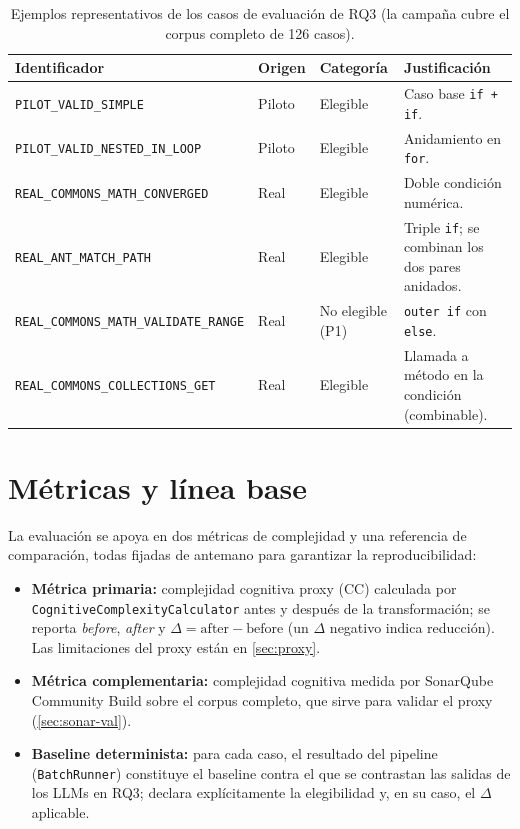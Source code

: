 \begin{table}[ht]
\centering
\footnotesize
\caption{Ejemplos representativos de los casos de evaluación de RQ3
(la campaña cubre el corpus completo de 126 casos).}
\label{tab:subset-rq3}
\begin{tabularx}{\linewidth}{@{}lll>{\raggedright\arraybackslash}X@{}}
\toprule
\textbf{Identificador} & \textbf{Origen} & \textbf{Categoría} & \textbf{Justificación} \\
\midrule
\texttt{PILOT\_VALID\_SIMPLE} & Piloto & Elegible & Caso base \lstinline|if + if|. \\
\texttt{PILOT\_VALID\_NESTED\_IN\_LOOP} & Piloto & Elegible & Anidamiento en \lstinline|for|. \\
\texttt{REAL\_COMMONS\_MATH\_CONVERGED} & Real & Elegible & Doble condición numérica. \\
\texttt{REAL\_ANT\_MATCH\_PATH} & Real & Elegible & Triple \lstinline|if|; se combinan los dos pares anidados. \\
\texttt{REAL\_COMMONS\_MATH\_VALIDATE\_RANGE} & Real & No elegible (P1) & \lstinline|outer if| con \lstinline|else|. \\
\texttt{REAL\_COMMONS\_COLLECTIONS\_GET} & Real & Elegible & Llamada a método en la condición (combinable). \\
\bottomrule
\end{tabularx}
\end{table}

\section{Métricas y línea base}
La evaluación se apoya en dos métricas de complejidad y una referencia de
comparación, todas fijadas de antemano para garantizar la reproducibilidad:
\begin{itemize}
  \item \textbf{Métrica primaria:} complejidad cognitiva proxy (CC) calculada
  por \texttt{Cognitive\allowbreak Complexity\allowbreak Calculator} antes y después de la
  transformación; se reporta \emph{before}, \emph{after} y
  $\Delta = \text{after} - \text{before}$ (un $\Delta$ negativo indica
  reducción). Las limitaciones del proxy están en \autoref{sec:proxy}.
  \item \textbf{Métrica complementaria:} complejidad cognitiva medida por
  SonarQube Community Build sobre el corpus completo, que sirve para validar el
  proxy (\autoref{sec:sonar-val}).
  \item \textbf{Baseline determinista:} para cada caso, el resultado del
  pipeline (\texttt{BatchRunner}) constituye el baseline contra el que se
  contrastan las salidas de los LLMs en RQ3; declara explícitamente la
  elegibilidad y, en su caso, el $\Delta$ aplicable.
\end{itemize}

